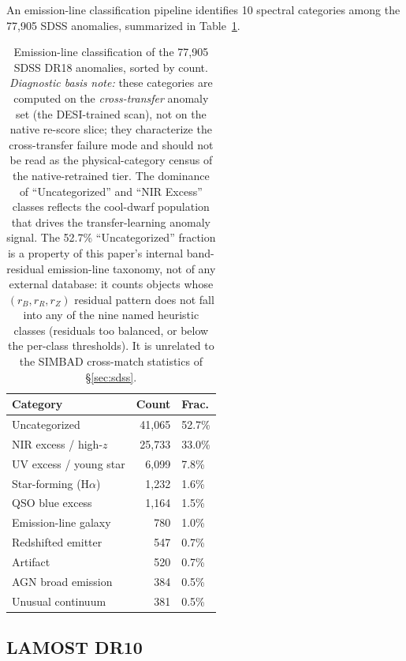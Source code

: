 \documentclass[aps,prd,twocolumn,superscriptaddress,showpacs,preprintnumbers,nofootinbib,longbibliography,floatfix]{revtex4-2}
\begin{document}
An emission-line classification pipeline identifies 10 spectral categories among the 77{,}905 SDSS anomalies, summarized in Table~\ref{tab:sdss_classes}.

\begin{table}[tb]
\caption{\label{tab:sdss_classes} Emission-line classification of the 77{,}905 SDSS DR18 anomalies, sorted by count. \textit{Diagnostic basis note:} these categories are computed on the \emph{cross-transfer} anomaly set (the DESI-trained scan), not on the native re-score slice; they characterize the cross-transfer failure mode and should not be read as the physical-category census of the native-retrained tier. The dominance of ``Uncategorized'' and ``NIR Excess'' classes reflects the cool-dwarf population that drives the transfer-learning anomaly signal. The 52.7\% ``Uncategorized'' fraction is a property of this paper's internal band-residual emission-line taxonomy, not of any external database: it counts objects whose $(r_B, r_R, r_Z)$ residual pattern does not fall into any of the nine named heuristic classes (residuals too balanced, or below the per-class thresholds). It is unrelated to the SIMBAD cross-match statistics of \S\ref{sec:sdss}.}
\begin{ruledtabular}
\begin{tabular}{lrl}
\textbf{Category} & \textbf{Count} & \textbf{Frac.} \\
\hline
Uncategorized         & 41{,}065 & 52.7\% \\
NIR excess / high-$z$ & 25{,}733 & 33.0\% \\
UV excess / young star &  6{,}099 &  7.8\% \\
Star-forming (H$\alpha$) & 1{,}232 &  1.6\% \\
QSO blue excess       &  1{,}164 &  1.5\% \\
Emission-line galaxy  &    780 &  1.0\% \\
Redshifted emitter    &    547 &  0.7\% \\
Artifact              &    520 &  0.7\% \\
AGN broad emission    &    384 &  0.5\% \\
Unusual continuum     &    381 &  0.5\% \\
\end{tabular}
\end{ruledtabular}
\end{table}


\subsection{LAMOST DR10}\label{sec:lamost}
\end{document}
